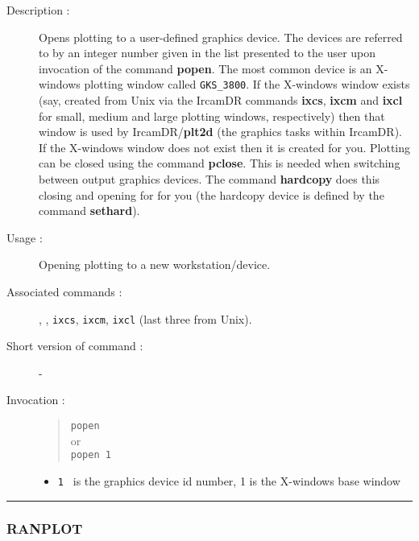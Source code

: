 \begin{description}

\item[Description :] Opens plotting to a user-defined graphics device.
The devices are referred to by an integer number given in the list
presented to the user upon invocation of the command {\bf popen}.  The most
common device is an X-windows plotting window called {\tt GKS\_3800}.
If the X-windows window exists (say, created from Unix via the {\sc
IrcamDR} commands {\bf ixcs}, {\bf ixcm} and {\bf ixcl} for small,
medium and large plotting windows, respectively) then that window is
used by {\sc IrcamDR}/{\bf plt2d} (the graphics tasks within {\sc
IrcamDR}).  If the X-windows window does not exist then it is created
for you.  Plotting can be closed using the command {\bf pclose}.  This
is needed when switching between output graphics devices.  The command
{\bf hardcopy} does this closing and opening for for you (the hardcopy
device is defined by the command {\bf sethard}).

\item[Usage :] Opening plotting to a new workstation/device.
\item[Associated commands :] {\tt {}}, 
{\tt {}}, {\tt ixcs}, {\tt ixcm}, {\tt ixcl} 
(last three from Unix).
\item[Short version of command :] -
\item[Invocation :]

\begin{quote}{\tt  popen }\\
or \\
{\tt popen 1 }
\end{quote}

\begin{itemize}

\item {\tt 1 } is the graphics device id number, 1  is the X-windows
 base window
\end{itemize}

\end{description}

\hrule 
\subsubsection*{\label{RANPLOT}RANPLOT}

